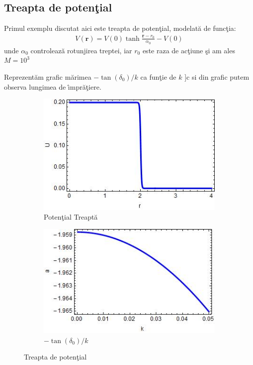 \subsection{Treapta de poten\c{t}ial}

Primul exemplu discutat aici este treapta de poten\c{t}ial, modelat\u{a} de func\c{t}ia:
\begin{align}
V({\bm r})=V(0)\tanh{\frac{{\bm r}-r_0}{\alpha_0}}-V(0)
\end{align}
unde $\alpha_0$ controleaz\u{a} rotunjirea treptei, iar $r_0$ este raza de ac\c{t}iune \c{s}i am ales $M =10^3$ 

Reprezent\u am grafic m\u arimea $-\tan(\delta_0)/k$ ca fun\c tie de $k$ ]c si din grafic putem observa lungimea de \^{\i}mpr\u a\c tiere.
\begin{figure}[h]
\centering
\begin{subfigure}{.5\textwidth}
  \centering
  \includegraphics[width=0.9\linewidth]{PotentialTreapta}
  \caption{Poten\c{t}ial Treapt\u{a}}
  \label{fig:sub311}
\end{subfigure}%
\begin{subfigure}{.5\textwidth}
  \centering
  \includegraphics[width=0.9\linewidth]{LungimeImprastiereTreapta}
  \caption{$-\tan(\delta_0)/k$}
  \label{fig:sub312}
\end{subfigure}
\caption{Treapta de poten\c{t}ial}
\label{fig:treapta}
\end{figure}


